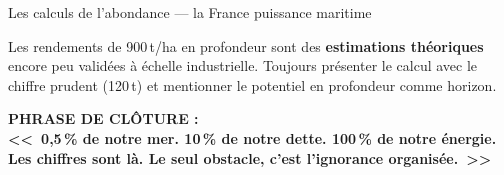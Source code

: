 \documentclass[a4paper,11pt]{article}
\begin{document}
\begin{fichejaune}{Les calculs de l'abondance --- la France puissance maritime}
\begin{anglemort}
Les rendements de 900\,t/ha en profondeur sont des \textbf{estimations th\'{e}oriques} encore peu valid\'{e}es \`{a} \'{e}chelle industrielle. Toujours pr\'{e}senter le calcul avec le chiffre prudent (120\,t) et mentionner le potentiel en profondeur comme horizon.
\end{anglemort}

\vspace{0.3cm}
\textbf{\color{ModeJaune}PHRASE DE CL\^{O}TURE :}\\
\textbf{\textcolor{ModeJaune}{<<~0{,}5\,\% de notre mer. 10\,\% de notre dette. 100\,\% de notre \'{e}nergie. Les chiffres sont l\`{a}. Le seul obstacle, c'est l'ignorance organis\'{e}e.~>>}}

\end{fichejaune}

\newpage

\end{document}
